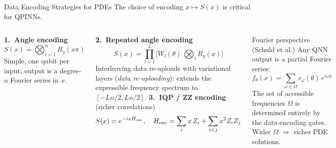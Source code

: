 \documentclass[aspectratio=169,10pt]{beamer}
\begin{document}
\begin{frame}{Data Encoding Strategies for PDEs}
  The choice of encoding $x\mapsto S(x)$ is critical for QPINNs.

  \begin{columns}[T]
      \textbf{1.\ Angle encoding}
      \[
        S(x) = \bigotimes_{i=1}^n R_y(x\pi)
      \]
      Simple, one qubit per input; output is a
      degree-$n$ Fourier series in $x$.

      \vspace{0.3cm}
      \textbf{2.\ Repeated angle encoding}
      \[
        S(x) = \prod_{l=1}^L\bigl[W_l(\theta)\,
          {\textstyle\bigotimes_i} R_y(x)\bigr]
      \]
      Interleaving data re-uploads with variational layers
      (\emph{data re-uploading}): extends the expressible
      frequency spectrum to $[-Ln/2, Ln/2]$.
      \textbf{3.\ IQP / ZZ encoding} (richer correlations)
      \[
        S(x) = e^{-ixH_{\rm enc}},\quad
        H_{\rm enc} = \sum_i x\,Z_i + \sum_{i<j}x^2 Z_iZ_j
      \]

      \vspace{0.3cm}
      \begin{alertblock}{Fourier perspective (Schuld et al.)}
        Any QNN output is a partial Fourier series:
        \[
          f_\theta(x) = \sum_{\omega\in\Omega}
            c_\omega(\theta)\,e^{i\omega x}
        \]
        The set of accessible frequencies $\Omega$ is
        determined entirely by the data-encoding gates.
        Wider $\Omega$ $\Rightarrow$ richer PDE solutions.
      \end{alertblock}
  \end{columns}
\end{frame}
\end{document}

